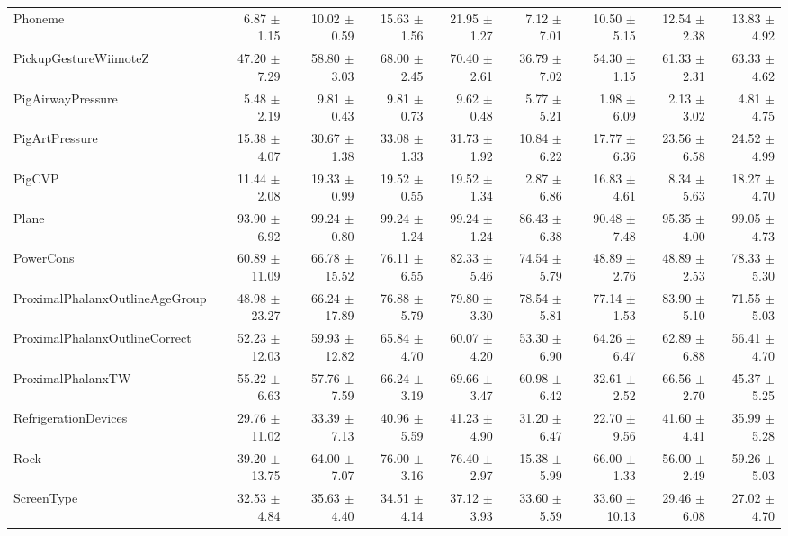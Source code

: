 \begin{landscape}
\begin{longtable}{lrrrrrrrr}
Phoneme & 6.87 $\pm$ 1.15 & 10.02 $\pm$ 0.59 & 15.63 $\pm$ 1.56 & 21.95 $\pm$ 1.27 & 7.12 $\pm$ 7.01 & 10.50 $\pm$ 5.15 & 12.54 $\pm$ 2.38 & 13.83 $\pm$ 4.92 \\
PickupGestureWiimoteZ & 47.20 $\pm$ 7.29 & 58.80 $\pm$ 3.03 & 68.00 $\pm$ 2.45 & 70.40 $\pm$ 2.61 & 36.79 $\pm$ 7.02 & 54.30 $\pm$ 1.15 & 61.33 $\pm$ 2.31 & 63.33 $\pm$ 4.62 \\
PigAirwayPressure & 5.48 $\pm$ 2.19 & 9.81 $\pm$ 0.43 & 9.81 $\pm$ 0.73 & 9.62 $\pm$ 0.48 & 5.77 $\pm$ 5.21 & 1.98 $\pm$ 6.09 & 2.13 $\pm$ 3.02 & 4.81 $\pm$ 4.75 \\
PigArtPressure & 15.38 $\pm$ 4.07 & 30.67 $\pm$ 1.38 & 33.08 $\pm$ 1.33 & 31.73 $\pm$ 1.92 & 10.84 $\pm$ 6.22 & 17.77 $\pm$ 6.36 & 23.56 $\pm$ 6.58 & 24.52 $\pm$ 4.99 \\
PigCVP & 11.44 $\pm$ 2.08 & 19.33 $\pm$ 0.99 & 19.52 $\pm$ 0.55 & 19.52 $\pm$ 1.34 & 2.87 $\pm$ 6.86 & 16.83 $\pm$ 4.61 & 8.34 $\pm$ 5.63 & 18.27 $\pm$ 4.70 \\
Plane & 93.90 $\pm$ 6.92 & 99.24 $\pm$ 0.80 & 99.24 $\pm$ 1.24 & 99.24 $\pm$ 1.24 & 86.43 $\pm$ 6.38 & 90.48 $\pm$ 7.48 & 95.35 $\pm$ 4.00 & 99.05 $\pm$ 4.73 \\
PowerCons & 60.89 $\pm$ 11.09 & 66.78 $\pm$ 15.52 & 76.11 $\pm$ 6.55 & 82.33 $\pm$ 5.46 & 74.54 $\pm$ 5.79 & 48.89 $\pm$ 2.76 & 48.89 $\pm$ 2.53 & 78.33 $\pm$ 5.30 \\
ProximalPhalanxOutlineAgeGroup & 48.98 $\pm$ 23.27 & 66.24 $\pm$ 17.89 & 76.88 $\pm$ 5.79 & 79.80 $\pm$ 3.30 & 78.54 $\pm$ 5.81 & 77.14 $\pm$ 1.53 & 83.90 $\pm$ 5.10 & 71.55 $\pm$ 5.03 \\
ProximalPhalanxOutlineCorrect & 52.23 $\pm$ 12.03 & 59.93 $\pm$ 12.82 & 65.84 $\pm$ 4.70 & 60.07 $\pm$ 4.20 & 53.30 $\pm$ 6.90 & 64.26 $\pm$ 6.47 & 62.89 $\pm$ 6.88 & 56.41 $\pm$ 4.70 \\
ProximalPhalanxTW & 55.22 $\pm$ 6.63 & 57.76 $\pm$ 7.59 & 66.24 $\pm$ 3.19 & 69.66 $\pm$ 3.47 & 60.98 $\pm$ 6.42 & 32.61 $\pm$ 2.52 & 66.56 $\pm$ 2.70 & 45.37 $\pm$ 5.25 \\
RefrigerationDevices & 29.76 $\pm$ 11.02 & 33.39 $\pm$ 7.13 & 40.96 $\pm$ 5.59 & 41.23 $\pm$ 4.90 & 31.20 $\pm$ 6.47 & 22.70 $\pm$ 9.56 & 41.60 $\pm$ 4.41 & 35.99 $\pm$ 5.28 \\
Rock & 39.20 $\pm$ 13.75 & 64.00 $\pm$ 7.07 & 76.00 $\pm$ 3.16 & 76.40 $\pm$ 2.97 & 15.38 $\pm$ 5.99 & 66.00 $\pm$ 1.33 & 56.00 $\pm$ 2.49 & 59.26 $\pm$ 5.03 \\
ScreenType & 32.53 $\pm$ 4.84 & 35.63 $\pm$ 4.40 & 34.51 $\pm$ 4.14 & 37.12 $\pm$ 3.93 & 33.60 $\pm$ 5.59 & 33.60 $\pm$ 10.13 & 29.46 $\pm$ 6.08 & 27.02 $\pm$ 4.70 \\

\end{longtable}
\end{landscape}
